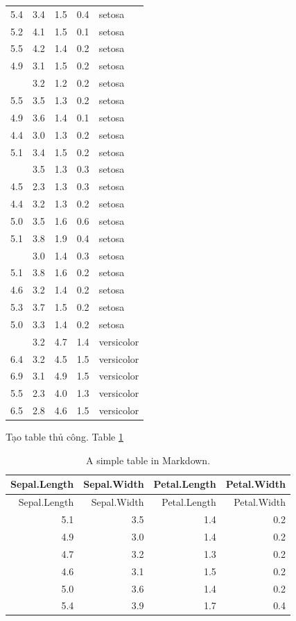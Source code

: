 \documentclass[
]{book}
\theoremstyle{definition}
\theoremstyle{definition}
\theoremstyle{definition}
\theoremstyle{definition}
\theoremstyle{remark}
\begin{document}
\begin{longtable}[t]{rrrrl}
5.4 & 3.4 & 1.5 & 0.4 & setosa\\
5.2 & 4.1 & 1.5 & 0.1 & setosa\\
5.5 & 4.2 & 1.4 & 0.2 & setosa\\
4.9 & 3.1 & 1.5 & 0.2 & setosa\\
\addlinespace
5.0 & 3.2 & 1.2 & 0.2 & setosa\\
5.5 & 3.5 & 1.3 & 0.2 & setosa\\
4.9 & 3.6 & 1.4 & 0.1 & setosa\\
4.4 & 3.0 & 1.3 & 0.2 & setosa\\
5.1 & 3.4 & 1.5 & 0.2 & setosa\\
\addlinespace
5.0 & 3.5 & 1.3 & 0.3 & setosa\\
4.5 & 2.3 & 1.3 & 0.3 & setosa\\
4.4 & 3.2 & 1.3 & 0.2 & setosa\\
5.0 & 3.5 & 1.6 & 0.6 & setosa\\
5.1 & 3.8 & 1.9 & 0.4 & setosa\\
\addlinespace
4.8 & 3.0 & 1.4 & 0.3 & setosa\\
5.1 & 3.8 & 1.6 & 0.2 & setosa\\
4.6 & 3.2 & 1.4 & 0.2 & setosa\\
5.3 & 3.7 & 1.5 & 0.2 & setosa\\
5.0 & 3.3 & 1.4 & 0.2 & setosa\\
\addlinespace
7.0 & 3.2 & 4.7 & 1.4 & versicolor\\
6.4 & 3.2 & 4.5 & 1.5 & versicolor\\
6.9 & 3.1 & 4.9 & 1.5 & versicolor\\
5.5 & 2.3 & 4.0 & 1.3 & versicolor\\
6.5 & 2.8 & 4.6 & 1.5 & versicolor\\
\bottomrule
\end{longtable}

Tạo table thủ công. Table \ref{tab:manual}

\begin{longtable}[]{@{}rrrr@{}}
\caption{\label{tab:manual} A simple table in Markdown.}\tabularnewline
\toprule
Sepal.Length & Sepal.Width & Petal.Length & Petal.Width \\
\midrule
\endfirsthead
\toprule
Sepal.Length & Sepal.Width & Petal.Length & Petal.Width \\
\midrule
\endhead
5.1 & 3.5 & 1.4 & 0.2 \\
4.9 & 3.0 & 1.4 & 0.2 \\
4.7 & 3.2 & 1.3 & 0.2 \\
4.6 & 3.1 & 1.5 & 0.2 \\
5.0 & 3.6 & 1.4 & 0.2 \\
5.4 & 3.9 & 1.7 & 0.4 \\
\bottomrule
\end{longtable}
\end{document}
